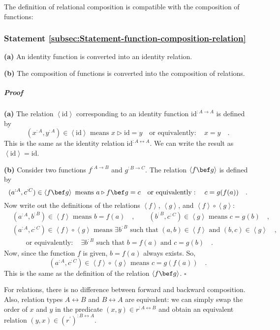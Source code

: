 The definition of relational composition is compatible with the composition
of functions:

\subsubsection{Statement \label{subsec:Statement-function-composition-relation}\ref{subsec:Statement-function-composition-relation}}

\textbf{(a)} An identity function is converted into an identity relation.

\textbf{(b)} The composition of functions is converted into the composition
of relations.

\subparagraph{Proof}

\textbf{(a)} The relation $\left<\text{id}\right>$ corresponding
to an identity function $\text{id}^{:A\rightarrow A}$ is defined
by
\[
(x^{:A},y^{:A})\in\left<\text{id}\right>\text{ means }x\triangleright\text{id}=y\quad\text{or equivalently}:\quad x=y\quad.
\]
This is the same as the identity relation $\text{id}^{:A\leftrightarrow A}$.
We can write the result as $\left<\text{id}\right>=\text{id}$.

\textbf{(b)} Consider two functions $f^{:A\rightarrow B}$ and $g^{:B\rightarrow C}$.
The relation $\left<f\bef g\right>$ is defined by
\[
(a^{:A},c^{:C})\in\left<f\bef g\right>\text{ means }a\triangleright f\bef g=c\quad\text{or equivalently}:\quad c=g(f(a))\quad.
\]
Now write out the definitions of the relations $\left<f\right>$,
$\left<g\right>$, and $\left<f\right>\circ\left<g\right>$:
\begin{align*}
 & (a^{:A},b^{:B})\in\left<f\right>\text{ means }b=f(a)\quad,\quad\quad(b^{:B},c^{:C})\in\left<g\right>\text{ means }c=g(b)\quad,\\
 & (a^{:A},c^{:C})\in\left<f\right>\circ\left<g\right>\text{ means }\exists b^{:B}\text{ such that }(a,b)\in\left<f\right>\text{ and }(b,c)\in\left<g\right>\quad,\\
 & \quad\quad\text{or equivalently}:\quad\exists b^{:B}\text{ such that }b=f(a)\text{ and }c=g(b)\quad.
\end{align*}
Now, since the function $f$ is given, $b=f(a)$ always exists. So,
\[
(a^{:A},c^{:C})\in\left<f\right>\circ\left<g\right>\text{ means }c=g(f(a))\quad.
\]
This is the same as the definition of the relation $\left<f\bef g\right>$.
$\square$

For relations, there is no difference between forward and backward
composition. Also, relation types $A\leftrightarrow B$ and $B\leftrightarrow A$
are equivalent: we can simply swap the order of $x$ and $y$ in the
predicate $(x,y)\in r^{:A\leftrightarrow B}$ and obtain an equivalent
relation $(y,x)\in(r^{\prime})^{:B\leftrightarrow A}$.


